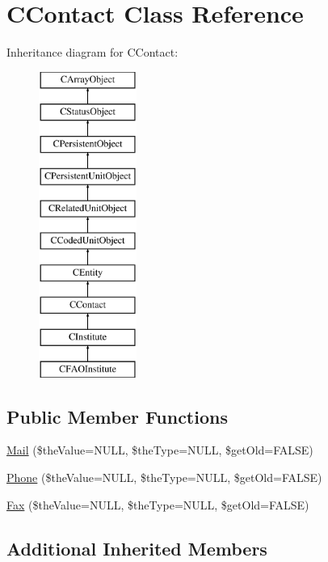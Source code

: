 \hypertarget{class_c_contact}{\section{C\-Contact Class Reference}
\label{class_c_contact}
}
Inheritance diagram for C\-Contact\-:\begin{figure}[H]
\begin{center}
\leavevmode
\includegraphics[height=10.000000cm]{class_c_contact}
\end{center}
\end{figure}
\subsection*{Public Member Functions}
\begin{DoxyCompactItemize}
\item 
\hyperlink{class_c_contact_aea135ec858be3986169b3764863455fd}{Mail} (\$the\-Value=N\-U\-L\-L, \$the\-Type=N\-U\-L\-L, \$get\-Old=F\-A\-L\-S\-E)
\item 
\hyperlink{class_c_contact_a33e959eb4723a50a402b0e573ec667ae}{Phone} (\$the\-Value=N\-U\-L\-L, \$the\-Type=N\-U\-L\-L, \$get\-Old=F\-A\-L\-S\-E)
\item 
\hyperlink{class_c_contact_aa2e82c640fc517c515ed9714de2e58e2}{Fax} (\$the\-Value=N\-U\-L\-L, \$the\-Type=N\-U\-L\-L, \$get\-Old=F\-A\-L\-S\-E)
\end{DoxyCompactItemize}
\subsection*{Additional Inherited Members}


